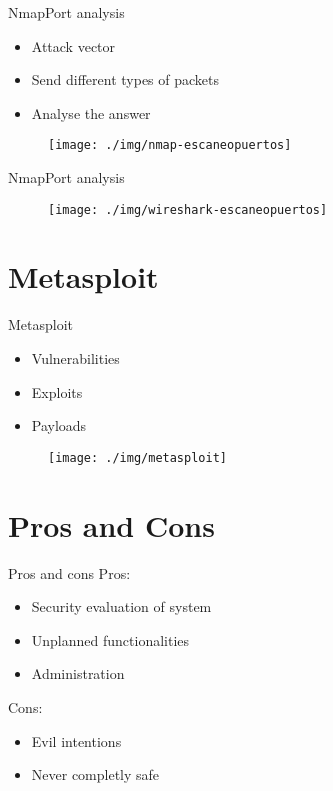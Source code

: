 \documentclass{beamer}
\begin{document}
\begin{frame}{Nmap}{Port analysis}
  \begin{itemize}
  \item Attack vector
  \item Send different types of packets
  \item Analyse the answer
  \end{itemize}
          \begin{figure}[h]
    \centering
    \texttt{[image: ./img/nmap-escaneopuertos]}
  \end{figure}
\end{frame}

\begin{frame}{Nmap}{Port analysis}
          \begin{figure}[h]
    \centering
    \texttt{[image: ./img/wireshark-escaneopuertos]}
  \end{figure}
\end{frame}

\section{Metasploit}
\begin{frame}{Metasploit}

  \begin{itemize}
  \item Vulnerabilities
  \item Exploits
  \item Payloads
  \end{itemize}
            \begin{figure}[h]
    \centering
    \texttt{[image: ./img/metasploit]}
  \end{figure}
\end{frame}

\section{Pros and Cons}
\begin{frame}{Pros and cons}
  Pros:
    \begin{itemize}
  \item Security evaluation of system
  \item Unplanned functionalities
  \item Administration 
    \end{itemize}

    Cons:
      \begin{itemize}
  \item Evil intentions
  \item Never completly safe
  \end{itemize}
\end{frame}
\end{document}
